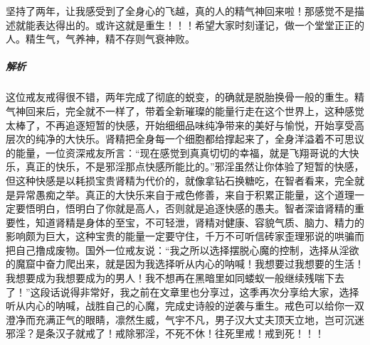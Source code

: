 \begin{case}
    坚持了两年，让我感受到了全身心的飞越，真的人的精气神回来啦！那感觉不是描述就能表达得出的。或许这就是重生！！！希望大家时刻谨记，做一个堂堂正正的人。精生气，气养神，精不存则气衰神败。
    \subparagraph{解析} 这位戒友戒得很不错，两年完成了彻底的蜕变，的确就是脱胎换骨一般的重生。精气神回来后，完全就不一样了，带着全新璀璨的能量行走在这个世界上，这种感觉太棒了，不再追逐短暂的快感，开始细细品味纯净带来的美好与愉悦，开始享受高层次的纯净的大快乐。肾精把全身每一个细胞都给撑起来了，全身洋溢着不可思议的能量，一位资深戒友所言：“现在感觉到真真切切的幸福，就是飞翔哥说的大快乐，真正的快乐，不是邪淫那点快感所能比的。”邪淫虽然让你体验了短暂的快感，但这种快感是以耗损宝贵肾精为代价的，就像拿钻石换糖吃，在智者看来，完全就是异常愚痴之举。真正的大快乐来自于戒色修善，来自于积累正能量，这个道理一定要悟明白，悟明白了你就是高人，否则就是追逐快感的愚夫。智者深谙肾精的重要性，知道肾精是身体的至宝，不可轻泄，肾精对健康、容貌气质、脑力、精力的影响颇为巨大，这种宝贵的能量一定要守住，千万不可听信砖家歪理邪说的哄骗而把自己撸成废物。国外一位戒友说：“我之所以选择摆脱心魔的控制，选择从淫欲的魔窟中奋力爬出来，就是因为我选择听从内心的呐喊！我想要过我想要的生活！我想要成为我想要成为的男人！我不想再在黑暗里如同蝼蚁一般继续残喘下去了！”这段话说得非常好，我之前在文章里也分享过，这季再次分享给大家，选择听从内心的呐喊，战胜自己的心魔，完成史诗般的逆袭与重生。戒色可以给你一双澄净而充满正气的眼睛，凛然生威，气宇不凡，男子汉大丈夫顶天立地，岂可沉迷邪淫？是条汉子就戒了！戒除邪淫，不死不休！往死里戒！戒到死！！！
\end{case}

